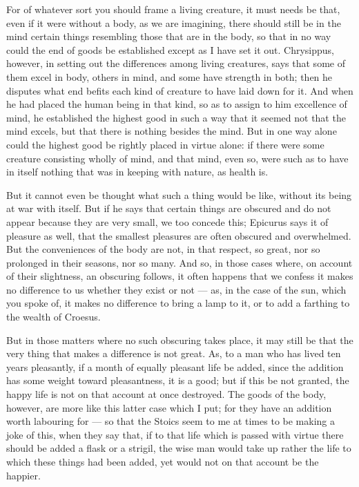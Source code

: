  For of whatever sort you should frame a living creature, it must needs be that, even if it were without a body, as we are imagining, there should still be in the mind certain things resembling those that are in the body, so that in no way could the end of goods be established except as I have set it out. Chrysippus, however, in setting out the differences among living creatures, says that some of them excel in body, others in mind, and some have strength in both; then he disputes what end befits each kind of creature to have laid down for it. And when he had placed the human being in that kind, so as to assign to him excellence of mind, he established the highest good in such a way that it seemed not that the mind excels, but that there is nothing besides the mind. But in one way alone could the highest good be rightly placed in virtue alone: if there were some creature consisting wholly of mind, and that mind, even so, were such as to have in itself nothing that was in keeping with nature, as health is.

 But it cannot even be thought what such a thing would be like, without its being at war with itself. But if he says that certain things are obscured and do not appear because they are very small, we too concede this; Epicurus says it of pleasure as well, that the smallest pleasures are often obscured and overwhelmed. But the conveniences of the body are not, in that respect, so great, nor so prolonged in their seasons, nor so many. And so, in those cases where, on account of their slightness, an obscuring follows, it often happens that we confess it makes no difference to us whether they exist or not — as, in the case of the sun, which you spoke of, it makes no difference to bring a lamp to it, or to add a farthing to the wealth of Croesus.

 But in those matters where no such obscuring takes place, it may still be that the very thing that makes a difference is not great. As, to a man who has lived ten years pleasantly, if a month of equally pleasant life be added, since the addition has some weight toward pleasantness, it is a good; but if this be not granted, the happy life is not on that account at once destroyed. The goods of the body, however, are more like this latter case which I put; for they have an addition worth labouring for — so that the Stoics seem to me at times to be making a joke of this, when they say that, if to that life which is passed with virtue there should be added a flask or a strigil, the wise man would take up rather the life to which these things had been added, yet would not on that account be the happier.

